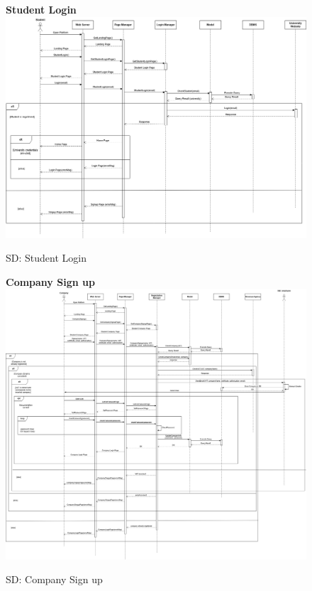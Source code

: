 \begin{figure}[H]
\textbf{Student Login}\newline\newline
\includegraphics[width=15cm]{images/architectural design/runtime/DD-UC2.drawio.png}
    \caption{SD: Student Login}
\end{figure}

\begin{figure}[H]
\textbf{Company Sign up}\newline\newline
\includegraphics[width=15cm]{images/architectural design/runtime/DD-UC3.drawio.png}
    \caption{SD: Company Sign up}
\end{figure}

